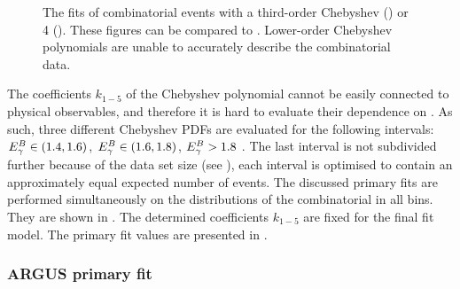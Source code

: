 \begin{figure}[htbp!]
    \centering
    \caption{\label{fig:lower_order_chebyshev}The \Mbc fits of combinatorial \BB events with a third-order Chebyshev \PDF () or 4 ().
    These figures can be compared to .
    Lower-order Chebyshev polynomials are unable to accurately describe the combinatorial \BB data.
    }
\end{figure}


The coefficients $k_{1-5}$ of the Chebyshev polynomial cannot be easily connected to physical observables,
and therefore it is hard to evaluate their dependence on \EB.
As such, three different Chebyshev PDFs are evaluated for the following intervals: ${E^B_{\gamma}}\in(1.4,1.6)$, ${E^B_{\gamma}}\in(1.6,1.8)$, ${E^B_{\gamma}}>1.8$ \gev.
The last interval is not subdivided further because of the data set size (see ), each interval is optimised to contain an approximately equal expected number of events.
The discussed primary fits are performed simultaneously on the \Mbc distributions of the combinatorial \BB in all \EB bins.
They are shown in .
The determined coefficients $k_{1-5}$ are fixed for the final \Mbc fit model.
The primary fit values are presented in .

\subsubsection{ARGUS primary fit}\label{sec:argus_prefit}

